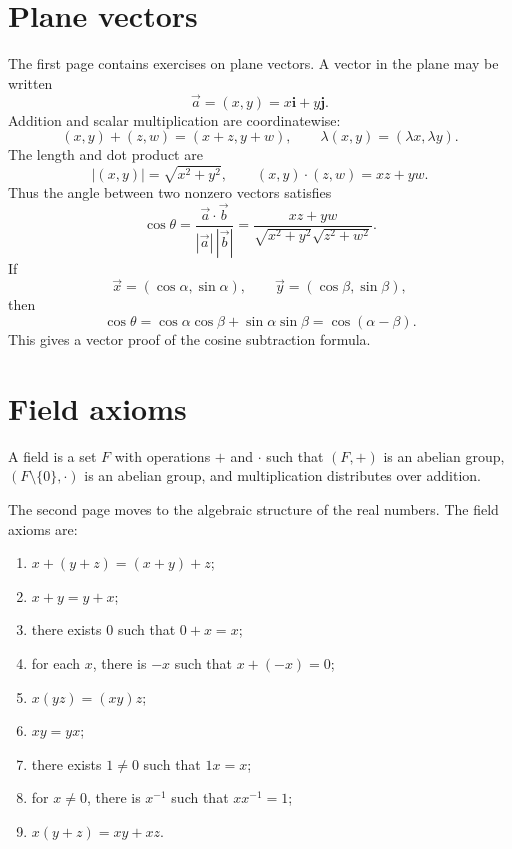 
\section{Plane vectors}

The first page contains exercises on plane vectors.  A vector in the plane may be written
\[
  \vec a=(x,y)=x\mathbf i+y\mathbf j.
\]
Addition and scalar multiplication are coordinatewise:
\[
  (x,y)+(z,w)=(x+z,y+w),\qquad
  \lambda(x,y)=(\lambda x,\lambda y).
\]
The length and dot product are
\[
  |(x,y)|=\sqrt{x^2+y^2},\qquad
  (x,y)\cdot(z,w)=xz+yw.
\]
Thus the angle between two nonzero vectors satisfies
\[
  \cos\theta=\frac{\vec a\cdot\vec b}{|\vec a|\,|\vec b|}
  =\frac{xz+yw}{\sqrt{x^2+y^2}\sqrt{z^2+w^2}}.
\]
If
\[
  \vec x=(\cos\alpha,\sin\alpha),\qquad
  \vec y=(\cos\beta,\sin\beta),
\]
then
\[
  \cos\theta=\cos\alpha\cos\beta+\sin\alpha\sin\beta
  =\cos(\alpha-\beta).
\]
This gives a vector proof of the cosine subtraction formula.

\section{Field axioms}

\begin{axiom}
A field is a set \(F\) with operations \(+\) and \(\cdot\) such that \((F,+)\) is an abelian group, \((F\setminus\{0\},\cdot)\) is an abelian group, and multiplication distributes over addition.
\end{axiom}


The second page moves to the algebraic structure of the real numbers.  The field axioms are:
\begin{enumerate}[(F1)]
  \item \(x+(y+z)=(x+y)+z\);
  \item \(x+y=y+x\);
  \item there exists \(0\) such that \(0+x=x\);
  \item for each \(x\), there is \(-x\) such that \(x+(-x)=0\);
  \item \(x(yz)=(xy)z\);
  \item \(xy=yx\);
  \item there exists \(1\neq0\) such that \(1x=x\);
  \item for \(x\neq0\), there is \(x^{-1}\) such that \(xx^{-1}=1\);
  \item \(x(y+z)=xy+xz\).
\end{enumerate}

